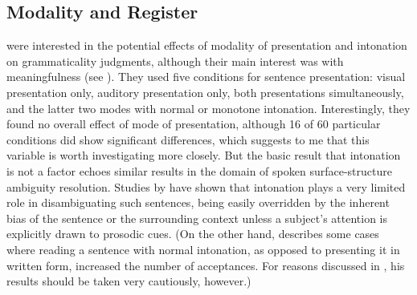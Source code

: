 \subsection{Modality and Register}\label{sec:5.2.6}

\citet{VetterEtAl1979} were interested in the potential effects of modality of presentation and intonation on grammaticality judgments, although their main interest was with meaningfulness (see ). They used five conditions for sentence presentation: visual presentation only, auditory presentation only, both presentations simultaneously, and the latter two modes with normal or monotone intonation. Interestingly, they found no overall effect of mode of presentation, although 16 of 60 particular conditions did show significant differences, which suggests to me that this variable is worth investigating more closely. But the basic result that intonation is not a factor echoes similar results in the domain of spoken surface-structure ambiguity resolution. Studies by \citet{Berkovits1981,Berkovits1982} have shown that intonation plays a very limited role in disambiguating such sentences, being easily overridden by the inherent bias of the sentence or the surrounding context unless a subject's attention is explicitly drawn to prosodic cues. (On the other hand, \citet{Hill1961} describes some cases where reading a sentence with normal intonation, as opposed to presenting it in written form, increased the number of acceptances. For reasons discussed in , his results should be taken very cautiously, however.)

